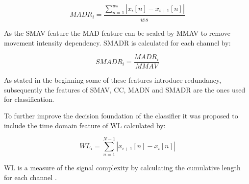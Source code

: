 \begin{equation} \label{eq:MADR}
MADR_i=\frac{\sum_{n=1}^{ws}|x_i[n]-x_{i+1}[n]|}{ws}
\end{equation}

As the SMAV feature the MAD feature can be scaled by MMAV to remove movement intensity dependency. SMADR is calculated for each channel by:

\begin{equation} \label{eq:MMADR}
SMADR_i=\frac{MADR_i}{MMAV}
\end{equation}


As stated in the beginning some of these features introduce redundancy, subsequently the features of SMAV, CC, MADN and SMADR are the ones used for classification. \cite{Donovan2017}

To further improve the decision foundation of the classifier it was proposed to include the time domain feature of WL calculated by: 

\begin{equation} \label{eq:WL}
WL_i=\sum_{n=1}^{N-1}|x_{i+1}[n]-x_i[n]|
\end{equation}

WL is a measure of the signal complexity by calculating the cumulative length for each channel \cite{Phiny2012}.

